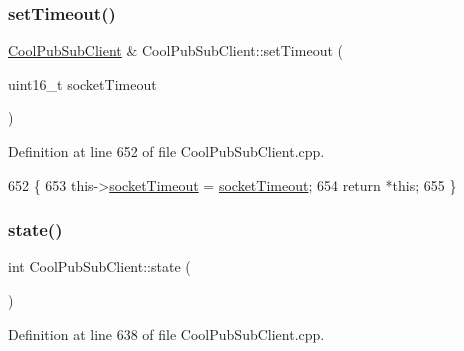 \subsubsection{\texorpdfstring{set\+Timeout()}{setTimeout()}}
{\footnotesize\ttfamily \hyperlink{class_cool_pub_sub_client}{Cool\+Pub\+Sub\+Client} \& Cool\+Pub\+Sub\+Client\+::set\+Timeout (\begin{DoxyParamCaption}\item[{uint16\+\_\+t}]{socket\+Timeout }\end{DoxyParamCaption})}



Definition at line 652 of file Cool\+Pub\+Sub\+Client.\+cpp.


\begin{DoxyCode}
652                                                                     \{
653     this->\hyperlink{class_cool_pub_sub_client_a2d7b7c7dda1313ff1492b158c3712630}{socketTimeout} = \hyperlink{class_cool_pub_sub_client_a2d7b7c7dda1313ff1492b158c3712630}{socketTimeout};
654     \textcolor{keywordflow}{return} *\textcolor{keyword}{this};
655 \}
\end{DoxyCode}
\mbox{\label{class_cool_pub_sub_client_a3245a5afc6d22e61270dcfe392ccb866}} 
\subsubsection{\texorpdfstring{state()}{state()}}
{\footnotesize\ttfamily int Cool\+Pub\+Sub\+Client\+::state (\begin{DoxyParamCaption}{ }\end{DoxyParamCaption})}



Definition at line 638 of file Cool\+Pub\+Sub\+Client.\+cpp.


